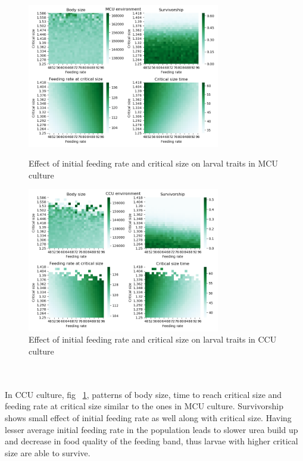 \begin{figure}[!tbp]
  \centering
  \includegraphics[width=0.75\textwidth]{C3/Figs/Critical_size_vs_Feeding_rate_MCU}
  \caption{Effect of initial feeding rate and critical size on larval traits in MCU culture}
  \label{fig:fr vs cs mcu}
  \vspace{24pt}
  \includegraphics[width=0.75\textwidth]{C3/Figs/Critical_size_vs_Feeding_rate_CCU}
  \caption{Effect of initial feeding rate and critical size on larval traits in CCU culture}
  \label{fig:fr vs cs ccu}
\end{figure}\\\\
In CCU culture, fig ~\ref{fig:fr vs cs ccu}, patterns of body size, time to reach critical size and feeding rate at critical size similar to the ones in MCU culture. Survivorship shows small effect of initial feeding rate as well along with critical size. Having lesser average initial feeding rate in the population leads to slower urea build up and decrease in food quality of the feeding band, thus larvae with higher critical size are able to survive.

